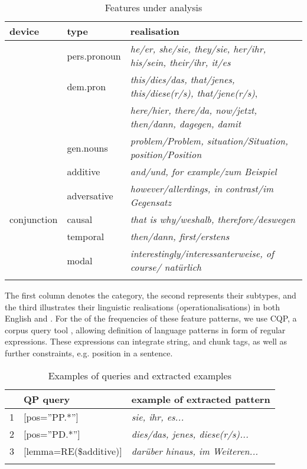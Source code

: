 \documentclass[output=paper]{langsci/langscibook.cls}
\begin{document}
\begin{table}

 
    \begin{tabularx}{\textwidth}{llQ}
    \lsptoprule
{\bf device}&{\bf type} & {\bf realisation}  \\
 
\midrule
& pers.pronoun   &  \textsl{he/er, she/sie, they/sie, her/ihr, his/sein, their/ihr, it/es} \\
\tablevspace
& dem.pron &  \textsl{this/dies/das, that/jenes, this/diese(r/s), that/jene(r/s)},\\
            &         &  \textsl{here/hier, there/da, now/jetzt, then/dann, dagegen, damit}\\
\tablevspace
& gen.nouns &  \textsl{problem/Problem, situation/Situation, position/Position}\\

\midrule 
& additive&  \textsl{and/und, for example/zum Beispiel}\\
\tablevspace
& adversative&  \textsl{however/allerdings, in contrast/im Gegensatz}\\
\tablevspace
conjunction  & causal&  \textsl{that is why/weshalb, therefore/deswegen}\\
\tablevspace
& temporal&  \textsl{then/dann, first/erstens}\\
\tablevspace
& modal&  \textsl{interestingly/interessanterweise, of course/ nat\"urlich}\\
\lspbottomrule
\end{tabularx}
  \caption{Features under analysis}
  \label{Table:features}
\end{table}

The first column denotes the category, the second represents their subtypes, and the third illustrates their linguistic realisations  (operationalisations) in both English and . For the  of the frequencies of these feature patterns, we use CQP, a corpus query tool \citep{Evert2005}, allowing definition of language patterns in form of regular expressions. These expressions can integrate string,  and chunk tags, as well as further constraints, e.g. position in a sentence.

\begin{table}
	
	 
	\begin{tabularx}{\textwidth}{llX}
		\lsptoprule
		& {\bf QP query} & {\bf example of extracted pattern}\\
		\midrule
		1& [pos=''PP.*''] &   \textsl{sie, ihr, es...}\\ 
	     2&[pos=''PD.*''] &   \textsl{dies/das, jenes, diese(r/s)...}\\
		 
				3  & [lemma=RE(\$additive)]&  \textsl{dar\"uber hinaus, im Weiteren...} \\
				\lspbottomrule
	\end{tabularx}
	\caption{Examples of queries and extracted examples}
	\label{Table:queries1}
\end{table}
\end{document}

